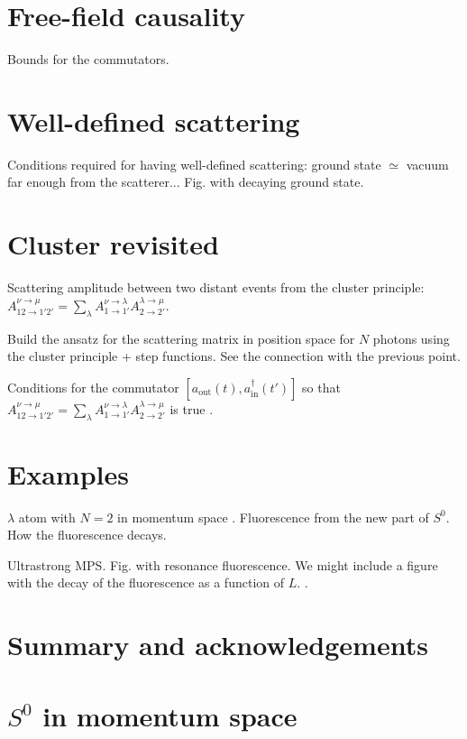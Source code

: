 \documentclass[aps,pra,reprint,amsmath,amssymb]{revtex4-1}
\begin{document}
\section{Free-field causality}

Bounds for the commutators.

\section{Well-defined scattering}

Conditions required for having well-defined scattering: ground state $\simeq$ vacuum far enough from the scatterer... Fig. with decaying ground state.

\section{Cluster revisited}

Scattering amplitude between two distant events from the cluster principle: $A_{12\to 1'2'}^{\nu\to\mu} = \sum_\lambda A_{1\to 1'}^{\nu\to\lambda}A_{2\to 2'}^{\lambda\to\mu}$.

Build the ansatz for the scattering matrix in position space for $N$ photons using the cluster principle + step functions. See the connection with the previous point.

Conditions for the commutator $[a_\text{out}(t),a_\text{in}^\dagger(t')]$ so that $A_{12\to 1'2'}^{\nu\to\mu} = \sum_\lambda A_{1\to 1'}^{\nu\to\lambda}A_{2\to 2'}^{\lambda\to\mu}$ is true \cite{Xu2015}.

\section{Examples}

$\lambda$ atom with $N=2$ in momentum space \cite{Xu2016}. Fluorescence from the new part of $S^0$. How the fluorescence decays.

Ultrastrong MPS. Fig. with resonance fluorescence. We might include a figure with the decay of the fluorescence as a function of $L$. \cite{Sanchez-Burillo2014,Sanchez-Burillo2015}.

\section{Summary and acknowledgements}

\appendix

\section{$S^0$ in momentum space}
\end{document}
